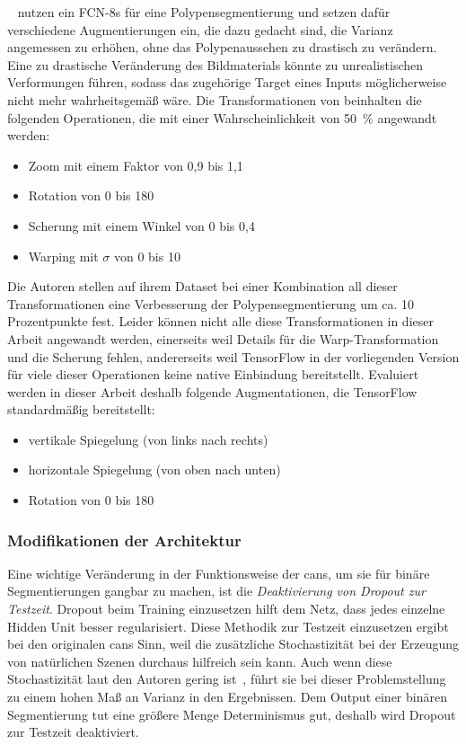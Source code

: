 \citeauthor{Vazquez.2017}~\cite{Vazquez.2017} nutzen ein FCN-8s für eine Polypensegmentierung und setzen dafür verschiedene Augmentierungen ein, die dazu gedacht sind, die Varianz angemessen zu erhöhen, ohne das Polypenaussehen zu drastisch zu verändern.
Eine zu drastische Veränderung des Bildmaterials könnte zu unrealistischen Verformungen führen, sodass das zugehörige Target eines Inputs möglicherweise nicht mehr wahrheitsgemäß wäre.
Die Transformationen von \citeauthor{Vazquez.2017} beinhalten die folgenden Operationen, die mit einer Wahrscheinlichkeit von 50~\% angewandt werden:

\begin{itemize}
	\item Zoom mit einem Faktor von 0,9 bis 1,1
	\item Rotation von 0 bis 180\textdegree
	\item Scherung mit einem Winkel von 0 bis 0,4
	\item Warping mit $ \sigma $ von 0 bis 10
\end{itemize}

Die Autoren stellen auf ihrem Dataset bei einer Kombination all dieser Transformationen eine Verbesserung der Polypensegmentierung um ca. 10 Prozentpunkte fest.
Leider können nicht alle diese Transformationen in dieser Arbeit angewandt werden, einerseits weil Details für die Warp-Transformation und die Scherung fehlen, andererseits weil TensorFlow in der vorliegenden Version für viele dieser Operationen keine native Einbindung bereitstellt.
Evaluiert werden in dieser Arbeit deshalb folgende Augmentationen, die TensorFlow standardmäßig bereitstellt:

\begin{itemize}
	\item vertikale Spiegelung (von links nach rechts)
	\item horizontale Spiegelung (von oben nach unten)
	\item Rotation von 0 bis 180\textdegree
\end{itemize}



\subsubsection{Modifikationen der Architektur}

Eine wichtige Veränderung in der Funktionsweise der \glspl{can}, um sie für binäre Segmentierungen gangbar zu machen, ist die \emph{Deaktivierung von Dropout zur Testzeit}.
Dropout beim Training einzusetzen hilft dem Netz, dass jedes einzelne Hidden Unit besser regularisiert.
Diese Methodik zur Testzeit einzusetzen ergibt bei den originalen \glspl{can} Sinn, weil die zusätzliche Stochastizität bei der Erzeugung von natürlichen Szenen durchaus hilfreich sein kann.
Auch wenn diese Stochastizität laut den Autoren gering ist~\cite{Isola.2017}, führt sie bei dieser Problemstellung zu einem hohen Maß an Varianz in den Ergebnissen.
Dem Output einer binären Segmentierung tut eine größere Menge Determinismus gut, deshalb wird Dropout zur Testzeit deaktiviert.
